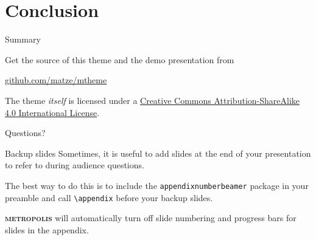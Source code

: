\documentclass[10pt]{beamer}
\newcommand{\themename}{\textbf{\textsc{metropolis}}\xspace}
\begin{document}
\section{Conclusion}

\begin{frame}{Summary}

  Get the source of this theme and the demo presentation from

  \begin{center}\url{github.com/matze/mtheme}\end{center}

  The theme \emph{itself} is licensed under a
  \href{http://creativecommons.org/licenses/by-sa/4.0/}{Creative Commons
  Attribution-ShareAlike 4.0 International License}.

  \begin{center}\ccbysa\end{center}

\end{frame}

{
\begin{frame}[standout]
  Questions?
\end{frame}
}

\appendix

\begin{frame}[fragile]{Backup slides}
  Sometimes, it is useful to add slides at the end of your presentation to
  refer to during audience questions.

  The best way to do this is to include the \verb|appendixnumberbeamer|
  package in your preamble and call \verb|\appendix| before your backup slides.

  \themename will automatically turn off slide numbering and progress bars for
  slides in the appendix.
\end{frame}

\fi
\end{document}
